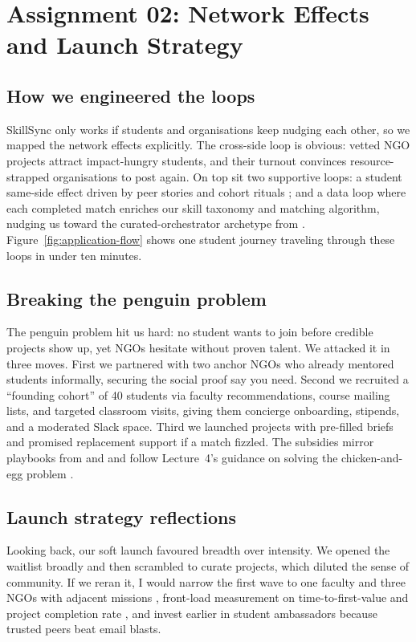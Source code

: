 \section*{Assignment 02: Network Effects and Launch Strategy}

\subsection*{How we engineered the loops}
SkillSync only works if students and organisations keep nudging each other, so we mapped the network effects explicitly. The cross-side loop is obvious: vetted NGO projects attract impact-hungry students, and their turnout convinces resource-strapped organisations to post again. On top sit two supportive loops: a student same-side effect driven by peer stories and cohort rituals \citep{Choudary2016}; and a data loop where each completed match enriches our skill taxonomy and matching algorithm, nudging us toward the curated-orchestrator archetype from \citet{Reillier2017}. Figure~\ref{fig:application-flow} shows one student journey traveling through these loops in under ten minutes.

\subsection*{Breaking the penguin problem}
The penguin problem hit us hard: no student wants to join before credible projects show up, yet NGOs hesitate without proven talent. We attacked it in three moves. First we partnered with two anchor NGOs who already mentored students informally, securing the social proof \citet{HagiuWright2013} say you need. Second we recruited a ``founding cohort'' of 40 students via faculty recommendations, course mailing lists, and targeted classroom visits, giving them concierge onboarding, stipends, and a moderated Slack space. Third we launched projects with pre-filled briefs and promised replacement support if a match fizzled. The subsidies mirror playbooks from \citet{Gunasilan2024} and \citet{FarrellSaloner1986} and follow Lecture~4's guidance on solving the chicken-and-egg problem \citep{Lecture04}.

\subsection*{Launch strategy reflections}
Looking back, our soft launch favoured breadth over intensity. We opened the waitlist broadly and then scrambled to curate projects, which diluted the sense of community. If we reran it, I would narrow the first wave to one faculty and three NGOs with adjacent missions \citep{Choudary2016}, front-load measurement on time-to-first-value and project completion rate \citep{ShapiroVarian1999}, and invest earlier in student ambassadors because trusted peers beat email blasts.

